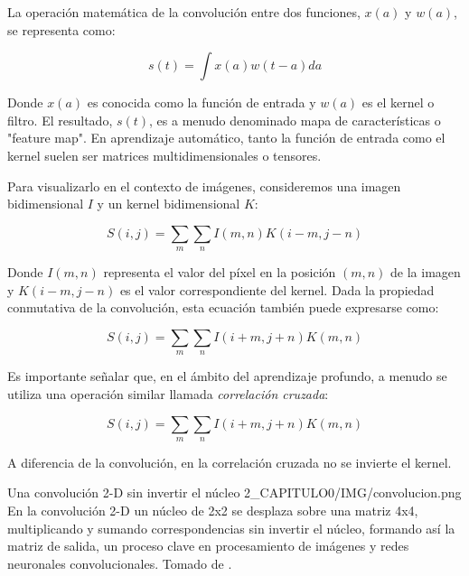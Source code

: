                     La operación matemática de la convolución entre dos funciones, $x(a)$ y $w(a)$, se representa como:
                    
                    \begin{equation}
                    s(t) = \int x(a)w(t-a)da
                    \end{equation}
                    
                    Donde $x(a)$ es conocida como la función de entrada y $w(a)$ es el kernel o filtro. El resultado, $s(t)$, es a menudo denominado mapa de características o "feature map". En aprendizaje automático, tanto la función de entrada como el kernel suelen ser matrices multidimensionales o tensores.
                    
                    Para visualizarlo en el contexto de imágenes, consideremos una imagen bidimensional $I$ y un kernel bidimensional $K$:
                    
                    \begin{equation}
                    S(i,j) = \sum_m \sum_n I(m,n)K(i-m,j-n)
                    \end{equation}
                    
                    Donde $I(m,n)$ representa el valor del píxel en la posición $(m,n)$ de la imagen y $K(i-m,j-n)$ es el valor correspondiente del kernel. Dada la propiedad conmutativa de la convolución, esta ecuación también puede expresarse como:
                    
                    \begin{equation}
                    S(i,j) = \sum_m \sum_n I(i+m,j+n)K(m,n)
                    \end{equation}
                    
                    Es importante señalar que, en el ámbito del aprendizaje profundo, a menudo se utiliza una operación similar llamada \textit{correlación cruzada}:
                    
                    \begin{equation}
                    S(i,j) = \sum_m \sum_n I(i+m,j+n)K(m,n)
                    \end{equation}
                    
                    A diferencia de la convolución, en la correlación cruzada no se invierte el kernel.

                    \insertfigure
                        {Una convolución 2-D sin invertir el núcleo}
                        {2_CAPITULO0/IMG/convolucion.png}
                        {En la convolución 2-D un núcleo de 2x2 se desplaza sobre una matriz 4x4, multiplicando y sumando correspondencias sin invertir el núcleo, formando así la matriz de salida, un proceso clave en procesamiento de imágenes y redes neuronales convolucionales. Tomado de \textcite{USGS2023}.} 
                

